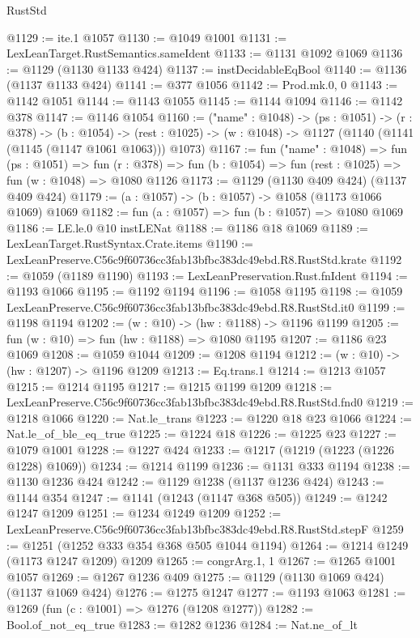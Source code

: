 \begin{lexlean}{RustStd}
\begin{coremodule}
@1129 := ite.{1} @1057
@1130 := @1049 @1001
@1131 := LexLeanTarget.RustSemantics.sameIdent
@1133 := @1131 @1092 @1069
@1136 := @1129 (@1130 @1133 @424)
@1137 := instDecidableEqBool
@1140 := @1136 (@1137 @1133 @424)
@1141 := @377 @1056
@1142 := Prod.mk.{0, 0}
@1143 := @1142 @1051
@1144 := @1143 @1055
@1145 := @1144 @1094
@1146 := @1142 @378
@1147 := @1146 @1054
@1160 := ("name" : @1048) ->
  (ps : @1051) ->
  (r : @378) ->
  (b : @1054) ->
  (rest : @1025) -> (w : @1048) -> @1127 (@1140 (@1141 (@1145 (@1147 @1061 @1063))) @1073)
@1167 := fun ("name" : @1048) =>
  fun (ps : @1051) =>
  fun (r : @378) => fun (b : @1054) => fun (rest : @1025) => fun (w : @1048) => @1080 @1126
@1173 := @1129 (@1130 @409 @424) (@1137 @409 @424)
@1179 := (a : @1057) -> (b : @1057) -> @1058 (@1173 @1066 @1069) @1069
@1182 := fun (a : @1057) => fun (b : @1057) => @1080 @1069
@1186 := LE.le.{0} @10 instLENat
@1188 := @1186 @18 @1069
@1189 := LexLeanTarget.RustSyntax.Crate.items
@1190 := LexLeanPreserve.C56c9f60736cc3fab13bfbc383dc49ebd.R8.RustStd.krate
@1192 := @1059 (@1189 @1190)
@1193 := LexLeanPreservation.Rust.fnIdent
@1194 := @1193 @1066
@1195 := @1192 @1194
@1196 := @1058 @1195
@1198 := @1059 LexLeanPreserve.C56c9f60736cc3fab13bfbc383dc49ebd.R8.RustStd.it0
@1199 := @1198 @1194
@1202 := (w : @10) -> (hw : @1188) -> @1196 @1199
@1205 := fun (w : @10) => fun (hw : @1188) => @1080 @1195
@1207 := @1186 @23 @1069
@1208 := @1059 @1044
@1209 := @1208 @1194
@1212 := (w : @10) -> (hw : @1207) -> @1196 @1209
@1213 := Eq.trans.{1}
@1214 := @1213 @1057
@1215 := @1214 @1195
@1217 := @1215 @1199 @1209
@1218 := LexLeanPreserve.C56c9f60736cc3fab13bfbc383dc49ebd.R8.RustStd.fnd0
@1219 := @1218 @1066
@1220 := Nat.le_trans
@1223 := @1220 @18 @23 @1066
@1224 := Nat.le_of_ble_eq_true
@1225 := @1224 @18
@1226 := @1225 @23
@1227 := @1079 @1001
@1228 := @1227 @424
@1233 := @1217 (@1219 (@1223 (@1226 @1228) @1069))
@1234 := @1214 @1199
@1236 := @1131 @333 @1194
@1238 := @1130 @1236 @424
@1242 := @1129 @1238 (@1137 @1236 @424)
@1243 := @1144 @354
@1247 := @1141 (@1243 (@1147 @368 @505))
@1249 := @1242 @1247 @1209
@1251 := @1234 @1249 @1209
@1252 := LexLeanPreserve.C56c9f60736cc3fab13bfbc383dc49ebd.R8.RustStd.stepF
@1259 := @1251 (@1252 @333 @354 @368 @505 @1044 @1194)
@1264 := @1214 @1249 (@1173 @1247 @1209) @1209
@1265 := congrArg.{1, 1}
@1267 := @1265 @1001 @1057
@1269 := @1267 @1236 @409
@1275 := @1129 (@1130 @1069 @424) (@1137 @1069 @424)
@1276 := @1275 @1247
@1277 := @1193 @1063
@1281 := @1269 (fun (c : @1001) => @1276 (@1208 @1277))
@1282 := Bool.of_not_eq_true
@1283 := @1282 @1236
@1284 := Nat.ne_of_lt

\end{coremodule}
\end{lexlean}
